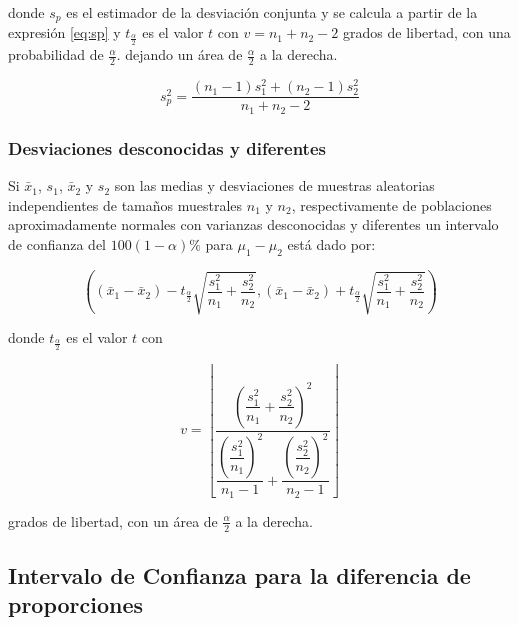 \documentclass[
]{krantz}
\begin{document}
donde \(s_p\) es el estimador de la desviación conjunta y se calcula a partir de la expresión \eqref{eq:sp} y \(t_{\frac{\alpha}{2}}\) es el valor \(t\) con \(v=n_1+n_2-2\) grados de libertad, con una probabilidad de \(\frac{\alpha}{2}\). dejando un área de \(\frac{\alpha}{2}\) a la derecha.

\begin{equation} 
s_p^2 = \dfrac{\left(n_1 - 1 \right)s_1^2+\left(n_2 - 1 \right)s_2^2}{n_1 +n_2 -2} 
\label{eq:sp}
\end{equation}

\hypertarget{desviaciones-desconocidas-y-diferentes}{%
\subsubsection{Desviaciones desconocidas y diferentes}\label{desviaciones-desconocidas-y-diferentes}}

Si \(\bar{x}_1\), \(s_1\), \(\bar{x}_2\) y \(s_2\) son las medias y desviaciones de muestras aleatorias independientes de tamaños muestrales \(n_1\) y \(n_2\), respectivamente de poblaciones aproximadamente normales con varianzas desconocidas y diferentes un intervalo de confianza del \(100\left(1-\alpha \right)\%\) para \(\mu_1 - \mu_2\) está dado por:

\begin{equation} 
\left( \left( \bar{x}_1 - \bar{x}_2 \right) - t_{\frac{\alpha}{2}}\sqrt{\dfrac{s_1^2}{n_1} + \dfrac{s_2^2}{n_2}} , \left( \bar{x}_1 - \bar{x}_2 \right) + t_{\frac{\alpha}{2}}\sqrt{\dfrac{s_1^2}{n_1} + \dfrac{s_2^2}{n_2}} \right) 
\label{eq:ic2msdd}
\end{equation}

donde \(t_{\frac{\alpha}{2}}\) es el valor \(t\) con

\begin{equation} 
v = \left\lfloor\dfrac{\left(\dfrac{s_1^2}{n_1} + \dfrac{s_2^2}{n_2} \right)^2}{\dfrac{\left( \dfrac{s_1^2}{n_1} \right)^2}{n_1-1}+\dfrac{\left( \dfrac{s_2^2}{n_2} \right)^2}{n_2-1}}\right\rfloor
\label{eq:dfsdd}
\end{equation}

grados de libertad, con un área de \(\frac{\alpha}{2}\) a la derecha.

\hypertarget{intervalo-de-confianza-para-la-diferencia-de-proporciones}{%
\subsection{Intervalo de Confianza para la diferencia de proporciones}\label{intervalo-de-confianza-para-la-diferencia-de-proporciones}}
\end{document}
